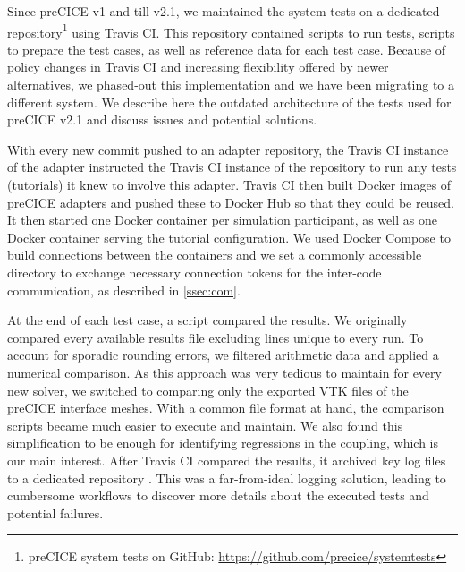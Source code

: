 Since preCICE v1 and till v2.1, we maintained the system tests on a dedicated repository\footnote{preCICE system tests on GitHub: \url{https://github.com/precice/systemtests}} using Travis CI. This repository contained scripts to run tests, scripts to prepare the test cases, as well as reference data for each test case. Because of policy changes in Travis CI and increasing flexibility offered by newer alternatives, we phased-out this implementation and we have been migrating to a different system. We describe here the outdated architecture of the tests used for preCICE v2.1 and discuss issues and potential solutions.

With every new commit pushed to an adapter repository, the Travis CI instance of the adapter instructed the Travis CI instance of the  repository to run any tests (tutorials) it knew to involve this adapter. Travis CI then built Docker images of preCICE adapters and pushed these to Docker Hub so that they could be reused. It then started one Docker container per simulation participant, as well as one Docker container serving the tutorial configuration. We used Docker Compose to build connections between the containers and we set a commonly accessible directory to exchange necessary connection tokens for the inter-code communication, as described in \autoref{ssec:com}.

At the end of each test case, a script compared the results. We originally compared every available results file excluding lines unique to every run. To account for sporadic rounding errors, we filtered arithmetic data and applied a numerical comparison. As this approach was very tedious to maintain for every new solver, we switched to comparing only the exported VTK files of the preCICE interface meshes. With a common file format at hand, the comparison scripts became much easier to execute and maintain. We also found this simplification to be enough for identifying regressions in the coupling, which is our main interest.
After Travis CI compared the results, it archived key log files to a dedicated repository .
This was a far-from-ideal logging solution, leading to cumbersome workflows to discover more details about the executed tests and potential failures.

